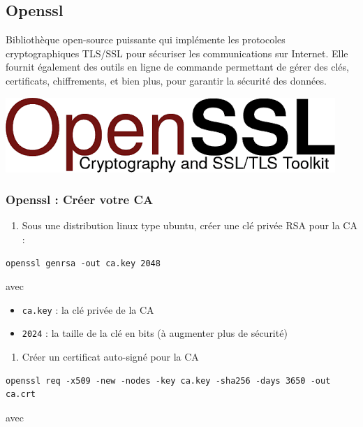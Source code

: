 \documentclass[french, 12pt]{article}%
\newcommand{\itemE}{\item[$\bullet$]}
\newcommand{\titreencadre}{Titre}
\newenvironment{encadre}[1]{\renewcommand{\titreencadre}{#1}
	\begin{mdframed}[style=encadrestyle]
	\vspace{0.5\baselineskip}
	}{%
	\end{mdframed}}
\begin{document}
\subsection{Openssl}

\begin{encadre}{OpenSSL}
Bibliothèque open-source puissante qui implémente les protocoles cryptographiques TLS/SSL pour sécuriser les communications sur Internet. Elle fournit également des outils en ligne de commande permettant de gérer des clés, certificats, chiffrements, et bien plus, pour garantir la sécurité des données.
\end{encadre}

\begin{center}
\includegraphics[scale=0.4]{./ressource/logoOpenSSL}
\end{center}

\subsubsection{Openssl : Créer votre CA}
\begin{enumerate}
\item Sous une distribution linux type ubuntu, créer une clé privée RSA pour la CA : 
\end{enumerate}

\begin{lstlisting}[style=commande]
openssl genrsa -out ca.key 2048
\end{lstlisting}
avec
\begin{itemize}
\itemE \verb?ca.key? : la clé privée de la CA
\itemE \verb?2024? : la taille de la clé en bits (à augmenter plus de sécurité)
\end{itemize}


\begin{enumerate}[resume]
\item Créer un certificat auto-signé pour la CA
\end{enumerate}
\begin{lstlisting}[style=commande]
openssl req -x509 -new -nodes -key ca.key -sha256 -days 3650 -out ca.crt
\end{lstlisting}
avec 
\end{document}
